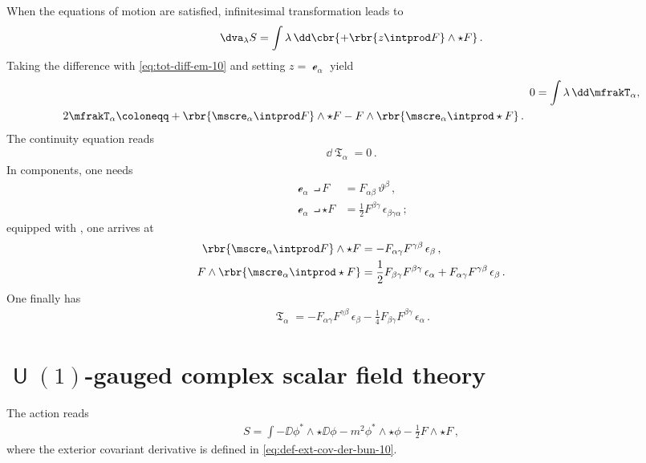\documentclass[a4paper]{article}
\begin{document}
When the equations of motion are satisfied, infinitesimal 
transformation leads to
\begin{align}
\dva_{\lambda} S = \int \lambda\,\dd\cbr{+\rbr{z\intprod F}\wedge\star F}\,.
\end{align}
Taking the difference with \cref{eq:tot-diff-em-10} and setting $z = 
\mscre_{\alpha}$ yield
\begin{align}
0 &= \int \lambda\,\dd \mfrakT_{\alpha}, \\
\begin{split}
2 \mfrakT_{\alpha} &\coloneqq +\rbr{\mscre_{\alpha}\intprod F}\wedge\star F -
	F \wedge\rbr{\mscre_{\alpha}\intprod\star F}\,.
\end{split}
\end{align}
The continuity equation reads
\begin{align}
\dd \mfrakT_{\alpha} = 0\,.
\end{align}
In components, one needs
\begin{align}
\mscre_{\alpha}\intprod F &= F_{\alpha\beta}\,\vartheta^{\beta}\,,
\\
\mscre_{\alpha}\intprod \star F &=
	\frac{1}{2} F^{\beta\gamma}\,\epsilon_{\beta\gamma\alpha}\,;
\end{align}
equipped with , one arrives at
\begin{align}
\rbr{\mscre_{\alpha}\intprod F}\wedge \star F &=
	- F_{\alpha\gamma} F^{\gamma\beta}\,\epsilon_{\beta}\,,
\\
F\wedge\rbr{\mscre_{\alpha}\intprod\star F} &=
	\frac{1}{2} F_{\beta\gamma} F^{\beta\gamma}\,\epsilon_{\alpha} +
	F_{\alpha\gamma} F^{\gamma\beta}\,\epsilon_{\beta}\,.
\end{align}
One finally has
\begin{align}
\mfrakT_{\alpha} =
	-F_{\alpha\gamma} F^{\gamma\beta}\,\epsilon_{\beta}
	-\frac{1}{4} F_{\beta\gamma} F^{\beta\gamma}\,\epsilon_{\alpha} \,.
\end{align}


\section[$U(1)$-gauged complex scalar field theory]%
{$\msansU(1)$-gauged complex scalar field theory}

The action reads
\begin{align}
S = \int -\DD\phi^*\wedge\star\DD\phi - m^2 \phi^*\wedge\star\phi
	-\frac{1}{2} F \wedge \star F\,,
\end{align}
where the exterior covariant derivative is defined in 
\cref{eq:def-ext-cov-der-bun-10}.
\end{document}
